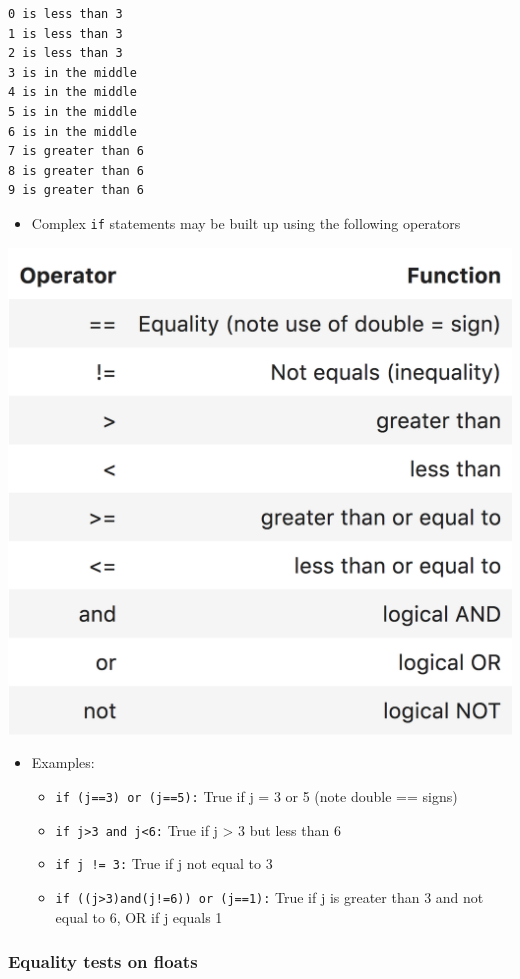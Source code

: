 \documentclass[10pt]{article}
\providecommand{\tightlist}{%
      \setlength{\itemsep}{0pt}\setlength{\parskip}{0pt}}
\begin{document}
    \begin{Verbatim}[commandchars=\\\{\}]
0 is less than 3
1 is less than 3
2 is less than 3
3 is in the middle
4 is in the middle
5 is in the middle
6 is in the middle
7 is greater than 6
8 is greater than 6
9 is greater than 6
    \end{Verbatim}

    \begin{itemize}
\tightlist
\item
  Complex \texttt{if} statements may be built up using the following
  operators
\end{itemize}

\includegraphics[width=0.45\linewidth]{ifoperator.png}


    \begin{itemize}
\tightlist
\item
  Examples:

  \begin{itemize}
  \tightlist
  \item
    \texttt{if\ (j==3)\ or\ (j==5):} True if j = 3 or 5 (note double ==
    signs)
  \item
    \texttt{if\ j\textgreater{}3\ and\ j\textless{}6:} True if j
    \textgreater{} 3 but less than 6
  \item
    \texttt{if\ j\ !=\ 3:} True if j not equal to 3
  \item
    \texttt{if\ ((j\textgreater{}3)and(j!=6))\ or\ (j==1):} True if j is
    greater than 3 and not equal to 6, OR if j equals 1
  \end{itemize}
\end{itemize}

    \hypertarget{equality-tests-on-floats}{%
\subsubsection{Equality tests on
floats}\label{equality-tests-on-floats}}
\end{document}
